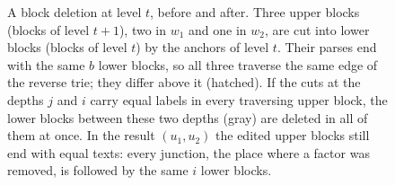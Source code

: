 \begin{figure}[t]
\caption{A block deletion at level $t$, before and after. Three upper blocks
(blocks of level $t+1$), two in $w_1$ and one in $w_2$, are cut into lower
blocks (blocks of level $t$) by the anchors of level $t$. Their parses end
with the same $b$ lower blocks, so all three traverse the same edge of the
reverse trie; they differ above it (hatched). If the cuts at the depths $j$
and $i$ carry equal labels in every traversing upper block, the lower blocks
between these two depths (gray) are deleted in all of them at once. In the
result $(u_1,u_2)$ the edited upper blocks still end with equal texts: every
junction, the place where a factor was removed, is followed by the same $i$
lower blocks.}
\label{fig:hierarchy}
\end{figure}
